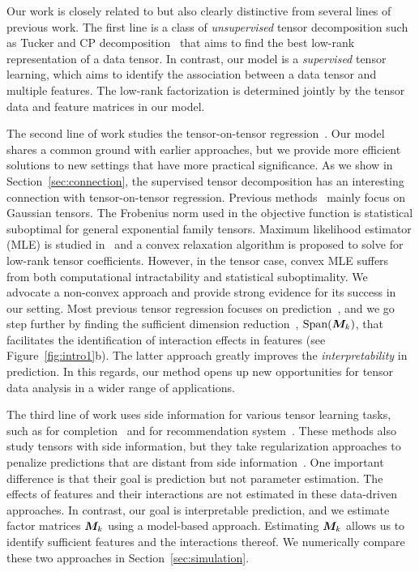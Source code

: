 \documentclass[12pt]{article}
\theoremstyle{definition}
\theoremstyle{definition}
\begin{document}
Our work is closely related to but also clearly distinctive from several lines of previous work. The first line is a class of \textit{unsupervised} tensor decomposition such as Tucker and CP decomposition~\citep{de2000multilinear, kolda2009tensor, hong2020generalized} that aims to find the best low-rank representation of a data tensor. In contrast, our model is a \textit{supervised} tensor learning, which aims to identify the association between a data tensor and multiple features. The low-rank factorization is determined jointly by the tensor data and feature matrices in our model.

The second line of work studies the tensor-on-tensor regression~\citep{raskutti2019convex, lock2018tensor,gahrooei2020multiple}. Our model shares a common ground with earlier approaches, but we provide more efficient solutions to new settings that have more practical significance. As we show in Section~\ref{sec:connection}, the supervised tensor decomposition has an interesting connection with tensor-on-tensor regression. Previous methods~\citep{lock2018tensor} mainly focus on Gaussian tensors. The Frobenius norm used in the objective function is statistical suboptimal for general exponential family tensors. Maximum likelihood estimator (MLE) is studied in~\citep{raskutti2019convex} and a convex relaxation algorithm is proposed to solve for low-rank tensor coefficients. However, in the tensor case, convex MLE suffers from both computational intractability and statistical suboptimality. We advocate a non-convex approach and provide strong evidence for its success in our setting. Most previous tensor regression focuses on prediction~\citep{lock2018tensor,raskutti2019convex}, and we go step further by finding the sufficient dimension reduction~\citep{adragni2009sufficient}, $\textup{Span}(\bm M_k)$, that facilitates the identification of interaction effects in features (see Figure~\ref{fig:intro1}b). The latter approach greatly improves the \emph{interpretability} in prediction. In this regards, our method opens up new opportunities for tensor data analysis in a wider range of applications. 

The third line of work uses side information for various tensor learning tasks, such as for completion~\citep{narita2012tensor} and for recommendation system~\citep{ioannidis2019coupled,farias2019learning}. These methods also study tensors with side information, but they take regularization approaches to penalize predictions that are distant from side information~\cite{lock2018supervised}. One important difference is that their goal is prediction but not parameter estimation. The effects of features and their interactions are not estimated in these data-driven approaches. In contrast, our goal is interpretable prediction, and we estimate factor matrices $\bm M_k$ using a model-based approach. Estimating $\bm M_k$ allows us to identify sufficient features and the interactions thereof. We numerically compare these two approaches in Section~\ref{sec:simulation}.
\end{document}
